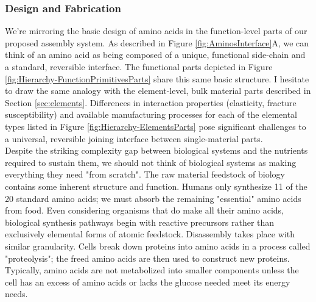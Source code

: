 {\subsubsection{Design and Fabrication}



We're mirroring the basic design of amino acids in the function-level parts of our proposed assembly system.  As described in Figure \ref{fig:AminosInterface}A, we can think of an amino acid as being composed of a unique, functional side-chain and a standard, reversible interface.  The functional parts depicted in Figure \ref{fig:Hierarchy-FunctionPrimitivesParts} share this same basic structure.  I hesitate to draw the same analogy with the element-level, bulk material parts described in Section \ref{sec:elements}.  Differences in interaction properties (elasticity, fracture susceptibility) and available manufacturing processes for each of the elemental types listed in Figure \ref{fig:Hierarchy-ElementsParts} pose significant challenges to a universal, reversible joining interface between single-material parts.\\

Despite the striking complexity gap between biological systems and the nutrients required to sustain them, we should not think of biological systems as making everything they need "from scratch".  The raw material feedstock of biology contains some inherent structure and function.  Humans only synthesize 11 of the 20 standard amino acids; we must absorb the remaining "essential" amino acids from food.  Even considering organisms that do make all their amino acids, biological synthesis pathways begin with reactive precursors rather than exclusively elemental forms of atomic feedstock\cite{Stryer1988}.  Disassembly takes place with similar granularity.  Cells break down proteins into amino acids in a process called "proteolysis"; the freed amino acids are then used to construct new proteins.  Typically, amino acids are not metabolized into smaller components unless the cell has an excess of amino acids or lacks the glucose needed meet its energy needs\cite{Stryer1988}.\\

}

